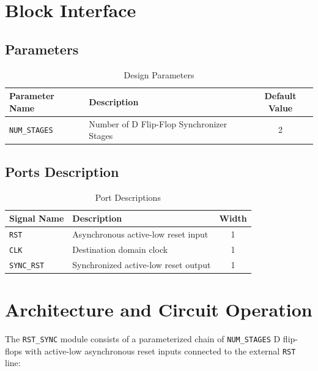 \documentclass[12pt,a4paper]{article}
\begin{document}
\section{Block Interface}

\subsection{Parameters}
\begin{table}[H]
\centering
\begin{tabular}{@{}llc@{}}
\toprule
\textbf{Parameter Name} & \textbf{Description} & \textbf{Default Value} \\
\midrule
\texttt{NUM\_STAGES} & Number of D Flip-Flop Synchronizer Stages & 2 \\
\bottomrule
\end{tabular}
\caption{Design Parameters}
\end{table}

\subsection{Ports Description}
\begin{table}[H]
\centering
\begin{tabular}{@{}llc@{}}
\toprule
\textbf{Signal Name} & \textbf{Description} & \textbf{Width} \\
\midrule
\texttt{RST}      & Asynchronous active-low reset input & 1 \\
\texttt{CLK}      & Destination domain clock            & 1 \\
\texttt{SYNC\_RST} & Synchronized active-low reset output & 1 \\
\bottomrule
\end{tabular}
\caption{Port Descriptions}
\end{table}

\section{Architecture and Circuit Operation}

The \texttt{RST\_SYNC} module consists of a parameterized chain of \texttt{NUM\_STAGES} D flip-flops with active-low asynchronous reset inputs connected to the external \texttt{RST} line:
\end{document}
